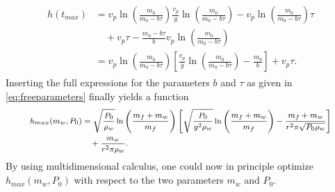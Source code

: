 \documentclass[a4paper,11pt]{report}
\begin{document}
\begin{align}\begin{aligned}
h(t_{max}) &= v_p\ln\left(\frac{m_0}{m_0-b\tau}\right)\frac{v_p}{g}\ln\left(\frac{m_0}{m_0-b\tau}\right)-v_p\ln\left(\frac{m_0}{m_0-b\tau}\right)\tau \\ &\quad + v_p\tau - \frac{m_0-b\tau}{b}v_p\ln\left(\frac{m_0}{m_0-b\tau}\right) \\
&= v_p\ln\left(\frac{m_0}{m_0-b\tau}\right)\left[\frac{v_p}{g}\ln\left(\frac{m_0}{m_0-b\tau}\right)-\frac{m_0}{b}\right] + v_p\tau.
\end{aligned}\end{align} Inserting the full expressions for the parameters $b$ and $\tau$ as given in \cref{eq:freeparameters} finally yields a function \begin{align}\footnotesize\begin{aligned}
h_{max}(m_w,P_0) &= \sqrt{\frac{P_0}{\rho_w}}\ln\left(\frac{m_f+m_w}{m_f}\right)\left[\sqrt{\frac{P_0}{g^2\rho_w}}\ln\left(\frac{m_f + m_w}{m_f}\right)-\frac{m_f + m_w}{r^2\pi \sqrt{P_0\rho_w}}\right]  \\ &\quad + \frac{m_w}{r^2\pi\rho_w}.
\end{aligned}\end{align} By using multidimensional calculus, one could now in principle optimize $h_{max}(m_w,P_0)$ with respect to the two parameters $m_w$ and $P_0$.
\end{document}
